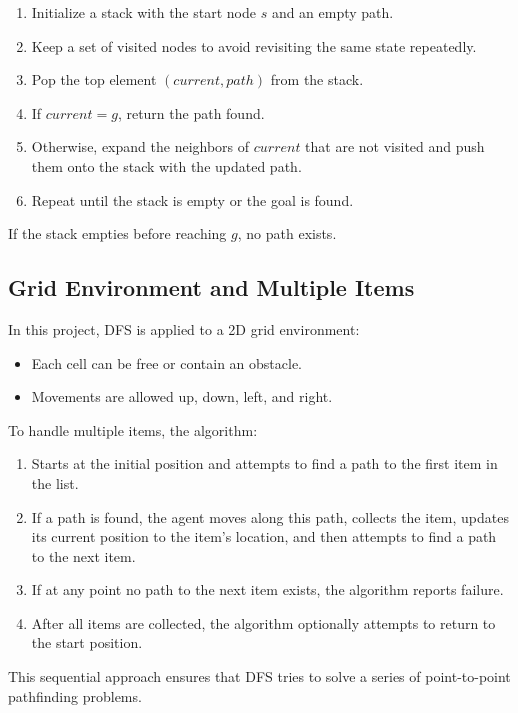 \documentclass[12pt]{article}
\begin{document}
\begin{enumerate}
    \item Initialize a stack with the start node \( s \) and an empty path.
    \item Keep a set of visited nodes to avoid revisiting the same state repeatedly.
    \item Pop the top element \((current, path)\) from the stack.
    \item If \( current = g \), return the path found.
    \item Otherwise, expand the neighbors of \( current \) that are not visited and push them onto the stack with the updated path.
    \item Repeat until the stack is empty or the goal is found.
\end{enumerate}

\noindent If the stack empties before reaching \( g \), no path exists.

\subsection{Grid Environment and Multiple Items}
In this project, DFS is applied to a 2D grid environment:
\begin{itemize}
    \item Each cell can be free or contain an obstacle.
    \item Movements are allowed up, down, left, and right.
\end{itemize}

\noindent To handle multiple items, the algorithm:
\begin{enumerate}
    \item Starts at the initial position and attempts to find a path to the first item in the list.
    \item If a path is found, the agent moves along this path, collects the item, updates its current position to the item's location, and then attempts to find a path to the next item.
    \item If at any point no path to the next item exists, the algorithm reports failure.
    \item After all items are collected, the algorithm optionally attempts to return to the start position.
\end{enumerate}

\noindent This sequential approach ensures that DFS tries to solve a series of point-to-point pathfinding problems.
\end{document}
